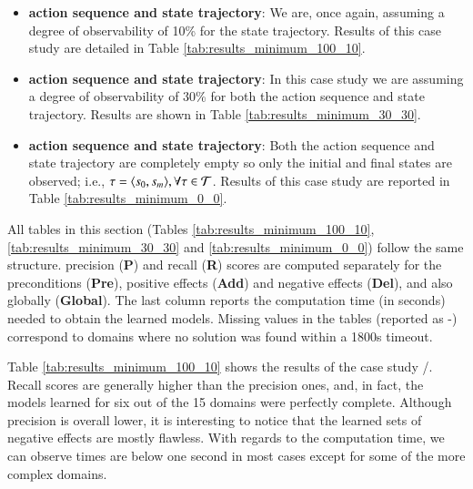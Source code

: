 \begin{itemize}
	\item \textbf{\FO action sequence and \PO state trajectory}: We are, once again, assuming a degree of observability of 10\% for the state trajectory. Results of this case study are detailed in Table \ref{tab:results_minimum_100_10}.
	\item  \textbf{\PO action sequence and \PO state trajectory}: In this case study we are assuming a degree of observability of 30\% for both the action sequence and state trajectory. Results are shown in Table \ref{tab:results_minimum_30_30}.
	\item  \textbf{\NO action sequence and \NO state trajectory}: Both the action sequence and state trajectory are completely empty so only the initial and final states are observed; i.e., $\tau = {\langle s_0, s_m \rangle}, \forall \tau \in \mathcal{T}$. Results of this case study are reported in Table \ref{tab:results_minimum_0_0}.
\end{itemize}

All tables in this section (Tables \ref{tab:results_minimum_100_10}, \ref{tab:results_minimum_30_30} and \ref{tab:results_minimum_0_0}) follow the same structure. precision ({\bf P}) and recall ({\bf R}) scores are computed separately for the preconditions ({\bf Pre}), positive effects ({\bf Add}) and negative effects ({\bf Del}), and also globally ({\bf Global}). The last column reports the computation time (in seconds) needed to obtain the learned models. Missing values in the tables (reported as -) correspond to domains where no solution was found within a 1800s timeout.

Table \ref{tab:results_minimum_100_10} shows the results of the case study \FO/\PO. Recall scores are generally higher than the precision ones, and, in fact, the models learned for six out of the 15 domains were perfectly complete. Although precision is overall lower, it is interesting to notice that the learned sets of negative effects are mostly flawless. With regards to the computation time, we can observe times are below one second in most cases except for some of the more complex domains.

